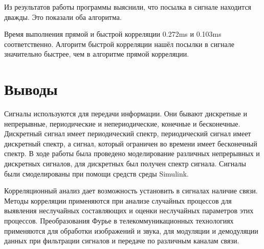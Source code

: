 \documentclass[a4paper,14pt]{extarticle}
\begin{document}
Из результатов работы программы выяснили, что посылка в сигнале находится дважды. Это показали оба алгоритма.

Время выполнения прямой и быстрой корреляции 0.272ms и 0.103ms соответственно. 
Алгоритм быстрой корреляции нашёл посылки в сигнале значительно быстрее, чем в алгоритме прямой корреляции.

\section{Выводы}

Сигналы используются для передачи информации. Они бывают дискретные и непрерывные, периодические и непериодические, конечные и бесконечные. Дискретный сигнал имеет периодический спектр, периодический сигнал имеет дискретный спектр, а сигнал, который ограничен во времени имеет бесконечный спектр.
В ходе работы была проведено моделирование различных непрерывных и дискретных сигналов, для дискретных был получен спектр сигнала. Сигналы были смоделированы при помощи средств среды Simulink.

Корреляционный анализ дает возможность установить в сигналах наличие связи. Методы корреляции применяются при анализе случайных процессов для выявления неслучайных составляющих и оценки неслучайных параметров этих процессов.
Преобразования Фурье в телекоммуникационных технологиях применяются для обработки изображений и звука, для модуляции и демодуляции данных при фильтрации сигналов и передаче по различным каналам связи.
\end{document}
